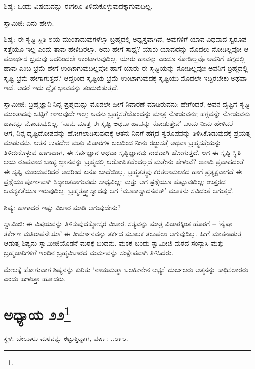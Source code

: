 ಶಿಷ್ಯ: ಒಂದು ವಿಷಯವನ್ನು ಈಗಲೂ ತಿಳಿದುಕೊಳ್ಳುವುದಕ್ಕಾಗುವುದಿಲ್ಲ.

ಸ್ವಾಮಿಜಿ: ಏನು ಹೇಳು.

ಶಿಷ್ಯ: ಈ ಸೃಷ್ಟಿ ಸ್ಥಿತಿ ಲಯ ಮುಂತಾದುವುಗಳೆಲ್ಲಾ ಬ್ರಹ್ಮದಲ್ಲಿ ಅಧ್ಯಸ್ತವಾಗಿವೆ, ಅವುಗಳಿಗೆ ಯಾವ ವಿಧವಾದ ಸ್ವರೂಪ ಸತ್ತೆಯೂ ಇಲ್ಲ ಎಂದು ತಾವು ಹೇಳಿದಿರಲ್ಲಾ, ಅದು ಹೇಗೆ ಸಾಧ್ಯ? ಯಾರು ಯಾವುದನ್ನು ಮೊದಲು ನೋಡಿಲ್ಲವೋ ಆ ಪದಾರ್ಥದ ಭ್ರಮವು ಅದರಿಂದಲೇ ಉಂಟಾಗುವುದಿಲ್ಲ. ಯಾರು ಹಾವನ್ನು ಎಂದೂ ನೋಡಿಲ್ಲವೊ ಅವನಿಗೆ ಹಗ್ಗದಲ್ಲಿ ಹಾವು ಎಂಬ ಭ್ರಮೆ ಹೇಗೆ ಉಂಟಾಗುವುದಿಲ್ಲವೋ ಹಾಗೆ ಯಾರು ಈ ಸೃಷ್ಟಿಯನ್ನು ನೋಡಿಲ್ಲವೋ ಅವನಿಗೆ ಬ್ರಹ್ಮದಲ್ಲಿ ಸೃಷ್ಟಿ ಭ್ರಮೆ ಹೇಗಾಗುತ್ತದೆ? ಆದ್ದರಿಂದ ಸೃಷ್ಟಿಯ ಭ್ರಮೆ ಉಂಟಾಗುವುದಕ್ಕೆ ಸೃಷ್ಟಿಯು ಮೊದಲೇ ಇದ್ದಿರಬೇಕು ಅಥವಾ ಇದೆ. ಆದರೆ ಇದು ದ್ವೈತ ಭಾವವನ್ನು ತಂದುಬಿಡುತ್ತದೆ.

ಸ್ವಾಮೀಜಿ: ಬ್ರಹ್ಮಜ್ಞಾನಿ ನಿನ್ನ ಪ್ರಶ್ನೆಯನ್ನು ಮೊದಲೇ ಹೀಗೆ ನಿವಾರಣೆ ಮಾಡಿರುವನು: ಹೇಗೆಂದರೆ, ಅವನ ದೃಷ್ಟಿಗೆ ಸೃಷ್ಟಿ ಮುಂತಾದವು ಒಟ್ಟಿಗೆ ಕಾಣುವುದೇ ಇಲ್ಲ; ಅವನು ಬ್ರಹ್ಮಸತ್ತೆಯೊಂದನ್ನು ಮಾತ್ರ ನೋಡುವನು; ಹಗ್ಗವನ್ನೇ ನೋಡುವನು ಹಾವನ್ನು ನೋಡುವುದಿಲ್ಲ. ‘ನಾನು ಮಾತ್ರ ಈ ಸೃಷ್ಟಿ ಅಥವಾ ಹಾವನ್ನು ನೋಡುತ್ತೇನೆ’ ಎಂದು ನೀನು ಹೇಳಿದರೆ – ಆಗ, ನಿನ್ನ ದೃಷ್ಟಿದೋಷವನ್ನು ಹೋಗಲಾಡಿಸುವುದಕ್ಕೆ ಆತನು ನಿನಗೆ ಹಗ್ಗದ ಸ್ವರೂಪವನ್ನು ತಿಳಿಸಿಕೊಡುವುದಕ್ಕೆ ಪ್ರಯತ್ನ ಮಾಡುವನು. ಆತನ ಉಪದೇಶ ಮತ್ತು ವಿಚಾರಗಳ ಬಲದಿಂದ ನೀನು ರಜ್ಜುಸತ್ತೆ ಅಥವಾ ಬ್ರಹ್ಮಸತ್ತೆಯನ್ನು ತಿಳಿದುಕೊಳ್ಳುವ ಹಾಗಾದಾಗ, ಈ ಸರ್ಪಜ್ಞಾನ ಅಥವಾ ಸೃಷ್ಟಿಜ್ಞಾನವು ನಾಶವಾಗಿ ಹೋಗುತ್ತದೆ. ಆಗ ಈ ಸೃಷ್ಟಿ ಸ್ಥಿತಿ ಲಯ ರೂಪವಾದ ಬಾಹ್ಯ ಜ್ಞಾನವನ್ನು ಬ್ರಹ್ಮದಲ್ಲಿ ಆರೋಪಿತವೆಂದಲ್ಲದೆ ಮತ್ತೇನು ಹೇಳುವೆ? ಅನಾದಿ ಪ್ರವಾಹದಂತೆ ಈ ಸೃಷ್ಟಿ ಮುಂದುವರಿದರೆ ಅದರಿಂದ ಏನೂ ಬಾಧೆಯಿಲ್ಲ. ಬ್ರಹ್ಮತತ್ತ್ವವು ಕರತಲಾಮಲಕದ ಹಾಗೆ ಪ್ರತ್ಯಕ್ಷವಾಗದೆ ಈ ಪ್ರಶ್ನೆಯು ಪೂರ್ಣವಾಗಿ ಸಿದ್ಧಾಂತವಾಗುವುದು ಸಾಧ್ಯವಿಲ್ಲ; ಮತ್ತು ಆಗ ಪ್ರಶ್ನೆಯೂ ಹುಟ್ಟುವುದಿಲ್ಲ; ಉತ್ತರದ ಆವಶ್ಯಕತೆಯೂ ಇರುವುದಿಲ್ಲ. ಬ್ರಹ್ಮತತ್ತ್ವಾಸ್ವಾದವು ಆಗ ‘ಮೂಕಾಸ್ವಾದನವತ್’ ಮೂಕನು ಸವಿದಂತೆ ಆಗುತ್ತದೆ.

ಶಿಷ್ಯ: ಹಾಗಾದರೆ ಇಷ್ಟು ವಿಚಾರ ಮಾಡಿ ಆಗುವುದೇನು?

ಸ್ವಾಮಿಜಿ: ಈ ವಿಷಯವನ್ನು ತಿಳಿಸುವುದಕ್ಕೋಸ್ಕರ ವಿಚಾರ. ಸತ್ಯವನ್ನು ಮಾತ್ರ ವಿಚಾರಕ್ಕಿಂತ ಹೊರಗೆ – ‘ನೈಷಾ ತರ್ಕೇಣ ಮತಿರಾಪನೇಯಾ’ ಈ ತೀರ್ಮಾನವನ್ನು ತರ್ಕದ ಮೂಲಕ ತಲುಪಲು ಆಗುವುದಿಲ್ಲ. ಹೀಗೆ ಮಾತನಾಡುತ್ತ ಆಡುತ್ತ ಶಿಷ್ಯನು ಸ್ವಾಮೀಜಿಯೊಡನೆ ಮಠಕ್ಕೆ ಬಂದನು. ಮಠಕ್ಕೆ ಬಂದು ಸ್ವಾಮೀಜಿ ಮಠದ ಸಂನ್ಯಾಸಿ ಮತ್ತು ಬ್ರಹ್ಮಚಾರಿಗಳಿಗೆ ಇಂದಿನ ಬ್ರಹ್ಮವಿಚಾರದ ಮರ್ಮವನ್ನು ಸಂಕ್ಷೇಪವಾಗಿ ತಿಳಿಸಿದರು.

ಮೇಲಕ್ಕೆ ಹೋಗುವಾಗ ಶಿಷ್ಯನನ್ನು ಕುರಿತು ‘ನಾಯಮತ್ಮಾ ಬಲಹೀನೇನ ಲಭ್ಯಃ’ ದುರ್ಬಲರು ಆತ್ಮನನ್ನು ಸಾಧಿಸಲಾರರು ಎಂದು ಹೇಳುತ್ತಾ ಹೋದರು.

\newpage

\chapter[ಅಧ್ಯಾಯ ೨೨]{ಅಧ್ಯಾಯ ೨೨\protect\footnote{}}

\centerline{ಸ್ಥಳ: ಬೇಲೂರು ಮಠವನ್ನು ಕಟ್ಟುತ್ತಿದ್ದಾಗ, ವರ್ಷ: ೧೮೯೮.}

